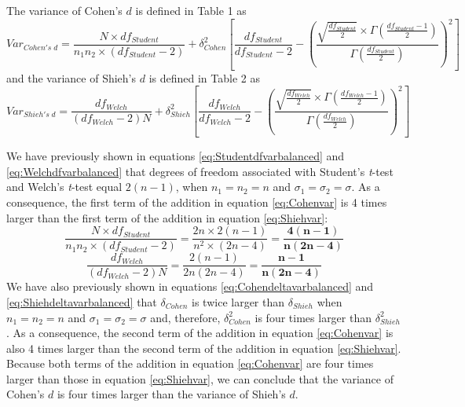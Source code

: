 \documentclass[
  english,
  man,floatsintext]{apa6}
\begin{document}
\begin{appendix}
The variance of Cohen's \(d\) is defined in Table 1 as \begin{equation}
Var_{Cohen's \; d}=\frac{N\times df_{Student}}{n_1n_2 \times (df_{Student}-2)} + \delta^2_{Cohen} \left[ \frac{df_{Student}}{df_{Student}-2} - \left( \frac{\sqrt{\frac{df_{Student}}{2}} \times \Gamma{\left(\frac{df_{Student}-1}{2}\right)}}{\Gamma{\left( \frac{df_{Student}}{2}\right)}} \right)^2\right]
\label{eq:Cohenvar}
\end{equation} and the variance of Shieh's \(d\) is defined in Table 2
as \begin{equation}
Var_{Shieh's \; d}=\frac{df_{Welch}}{(df_{Welch}-2)N}  + \delta^2_{Shieh} \left[ \frac{df_{Welch}}{df_{Welch}-2} - \left( \frac{\sqrt{\frac{df_{Welch}}{2}} \times \Gamma{\left(\frac{df_{Welch}-1}{2}\right)}}{\Gamma{\left( \frac{df_{Welch}}{2}\right)}} \right)^2 \right]
\label{eq:Shiehvar}
\end{equation}

We have previously shown in equations \ref{eq:Studentdfvarbalanced} and
\ref{eq:Welchdfvarbalanced} that degrees of freedom associated with
Student's \emph{t}-test and Welch's \emph{t}-test equal \(2(n-1)\), when
\(n_1=n_2=n\) and \(\sigma_1=\sigma_2=\sigma\). As a consequence, the
first term of the addition in equation \ref{eq:Cohenvar} is 4 times
larger than the first term of the addition in equation
\ref{eq:Shiehvar}:
\[\frac{N\times df_{Student}}{n_1n_2 \times (df_{Student}-2)}=\frac{2n\times 2(n-1)}{n^2 \times (2n-4)} =\bm{\frac{4(n-1)}{n(2n-4)}} \]
\[\frac{df_{Welch}}{(df_{Welch}-2)N} = \frac{2(n-1)}{2n(2n-4)}= \bm{\frac{n-1}{n(2n-4)}}\]
We have also previously shown in equations
\ref{eq:Cohendeltavarbalanced} and \ref{eq:Shiehdeltavarbalanced} that
\(\delta_{Cohen}\) is twice larger than \(\delta_{Shieh}\) when
\(n_1=n_2=n\) and \(\sigma_1=\sigma_2=\sigma\) and, therefore,
\(\delta^2_{Cohen}\) is four times larger than \(\delta^2_{Shieh}\). As
a consequence, the second term of the addition in equation
\ref{eq:Cohenvar} is also 4 times larger than the second term of the
addition in equation \ref{eq:Shiehvar}. Because both terms of the
addition in equation \ref{eq:Cohenvar} are four times larger than those
in equation \ref{eq:Shiehvar}, we can conclude that the variance of
Cohen's \(d\) is four times larger than the variance of Shieh's \(d\).
\end{appendix}
\end{document}
